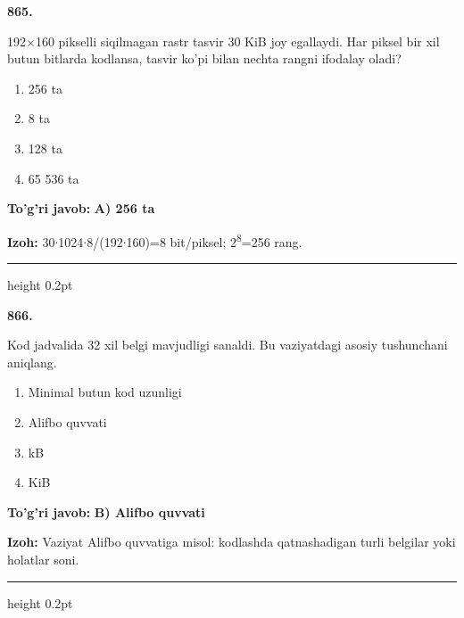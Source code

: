 \documentclass[10pt,a4paper,oneside]{article}
\begin{document}
\noindent\textbf{\color{ink}865.}
\par
192\ensuremath{\times}160 pikselli siqilmagan rastr tasvir 30 KiB joy egallaydi. Har piksel bir xil butun bitlarda kodlansa, tasvir ko'pi bilan nechta rangni ifodalay oladi?
\begin{enumerate}[label=\Alph*),leftmargin=9mm]
\item 256 ta
\item 8 ta
\item 128 ta
\item 65 536 ta
\end{enumerate}
\begin{tcolorbox}[enhanced,breakable,colback=teal!4,colframe=teal!50!black,boxrule=0.5pt,arc=1.1mm,left=3mm,right=3mm,top=1.7mm,bottom=1.7mm,before skip=2mm,after skip=2mm]
\textbf{\color{teal}To'g'ri javob:} \textbf{A) 256 ta}
\par\smallskip
\textbf{Izoh:} 30\ensuremath{\cdot}1024\ensuremath{\cdot}8/(192\ensuremath{\cdot}160)=8 bit/piksel; 2\textsuperscript{8}=256 rang.
\end{tcolorbox}
\vspace{2mm}\hrule height 0.2pt \vspace{3mm}

\noindent\textbf{\color{ink}866.}
\par
Kod jadvalida 32 xil belgi mavjudligi sanaldi. Bu vaziyatdagi asosiy tushunchani aniqlang.
\begin{enumerate}[label=\Alph*),leftmargin=9mm]
\item Minimal butun kod uzunligi
\item Alifbo quvvati
\item kB
\item KiB
\end{enumerate}
\begin{tcolorbox}[enhanced,breakable,colback=teal!4,colframe=teal!50!black,boxrule=0.5pt,arc=1.1mm,left=3mm,right=3mm,top=1.7mm,bottom=1.7mm,before skip=2mm,after skip=2mm]
\textbf{\color{teal}To'g'ri javob:} \textbf{B) Alifbo quvvati}
\par\smallskip
\textbf{Izoh:} Vaziyat Alifbo quvvatiga misol: kodlashda qatnashadigan turli belgilar yoki holatlar soni.
\end{tcolorbox}
\vspace{2mm}\hrule height 0.2pt \vspace{3mm}
\end{document}
